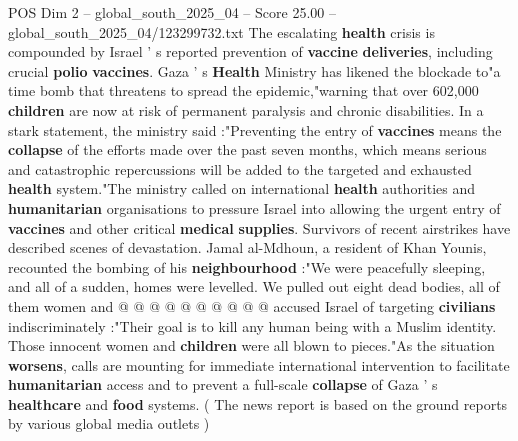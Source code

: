 \begin{textsample}{POS Dim 2 – global\_south\_2025\_04 – Score 25.00 – global\_south\_2025\_04/123299732.txt}
The escalating \textbf{health} crisis is compounded by Israel ' s reported prevention of \textbf{vaccine} \textbf{deliveries}, including crucial \textbf{polio} \textbf{vaccines}.
Gaza ' s \textbf{Health} Ministry has likened the blockade to"a time bomb that threatens to spread the epidemic,"warning that over 602,000 \textbf{children} are now at risk of permanent paralysis and chronic disabilities.
In a stark statement, the ministry said :"Preventing the entry of \textbf{vaccines} means the \textbf{collapse} of the efforts made over the past seven months, which means serious and catastrophic repercussions will be added to the targeted and exhausted \textbf{health} system."The ministry called on international \textbf{health} authorities and \textbf{humanitarian} organisations to pressure Israel into allowing the urgent entry of \textbf{vaccines} and other critical \textbf{medical} \textbf{supplies}.
Survivors of recent airstrikes have described scenes of devastation.
Jamal al-Mdhoun, a resident of Khan Younis, recounted the bombing of his \textbf{neighbourhood} :"We were peacefully sleeping, and all of a sudden, homes were levelled.
We pulled out eight dead bodies, all of them women and @ @ @ @ @ @ @ @ @ @ accused Israel of targeting \textbf{civilians} indiscriminately :"Their goal is to kill any human being with a Muslim identity.
Those innocent women and \textbf{children} were all blown to pieces."As the situation \textbf{worsens}, calls are mounting for immediate international intervention to facilitate \textbf{humanitarian} access and to prevent a full-scale \textbf{collapse} of Gaza ' s \textbf{healthcare} and \textbf{food} systems. ( The news report is based on the ground reports by various global media outlets )

\end{textsample}
